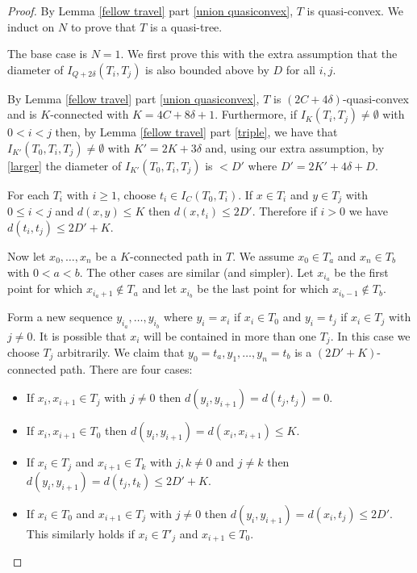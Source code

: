 \documentclass[11pt]{article}
\theoremstyle{remark}
\begin{document}
\begin{proof}
By Lemma \ref{fellow travel} part \eqref{union quasiconvex}, $T$ is quasi-convex. We induct on $N$ to prove that $T$ is a quasi-tree.

The base case is $N=1$. We first prove this with the extra assumption that the diameter of $I_{Q+2\delta}(T_i, T_j)$ is also bounded above by $D$ for all
$i,j$.


By Lemma \ref{fellow travel} part \eqref{union quasiconvex}, $T$ is $(2C+4\delta)$-quasi-convex and is $K$-connected with $K = 4C + 8\delta +1$.
Furthermore, if $I_K(T_i, T_j) \neq \emptyset$ with $0<i<j$ then, by Lemma \ref{fellow travel} part \eqref{triple}, we have that $I_{K'}(T_0, T_i, T_j) \neq \emptyset$ with $K' = 2K+3\delta$ and, using our extra assumption, by \eqref{larger} the diameter of $I_{K'}(T_0, T_i, T_j)$ is $< D'$ where $D' = 2K'+4\delta + D$.


For each $T_i$ with $i\ge1$, choose $t_i \in  I_{C}(T_0, T_i)$. If $x \in T_i$ and $y \in T_j$ with $0\le i<j$ and $d(x,y) \le K$ then $d(x, t_i) \le 2D'$. Therefore if $i> 0$ we have $d(t_i, t_j) \le 2D' +K$.

Now let $x_0, \dots, x_n$ be a $K$-connected path in $T$. We assume $x_0 \in T_a$ and $x_n \in T_b$ with $0<a<b$. The other cases are similar (and simpler). Let $x_{i_a}$ be the first point for which $x_{i_a+1} \not\in  T_a$ and let $x_{i_b}$ be the last point for which $x_{i_b-1} \not\in T_b$.

Form a new sequence $y_{i_a}, \dots, y_{i_b}$ where $y_i = x_i$ if $x_i \in T_0$ and $y_i = t_j$ if $x_i \in T_j$ with $j \neq 0$. It is possible that $x_i$ will be contained in more than one $T_j$. In this case we choose $T_j$ arbitrarily. We claim that $y_0 = t_a, y_1, \dots, y_n = t_b$ is a $(2D'+K)$-connected path. There are four cases:
\begin{itemize}
\item If $x_i, x_{i+1} \in T_j$ with $j \neq 0$ then $d(y_i, y_{i+1}) = d(t_j, t_j) = 0$. 
\item If $x_i, x_{i+1} \in T_0$ then $d(y_i,y_{i+1})= d(x_i, x_{i+1}) \le K$.
\item If $x_i \in T_j$ and $x_{i+1} \in T_k$ with $j,k\neq 0$ and $j\neq k$ then $d(y_i, y_{i+1}) = d(t_j, t_k) \le 2D'+K$.
\item If $x_i \in T_0$ and $x_{i+1} \in T_j$ with $j\neq 0$ then $d(y_i, y_{i+1}) = d(x_i,t_j) \le 2D'$. This similarly holds if $x_i \in T'_j$ and $x_{i+1} \in T_0$.
\end{itemize}


\end{proof}
\end{document}
